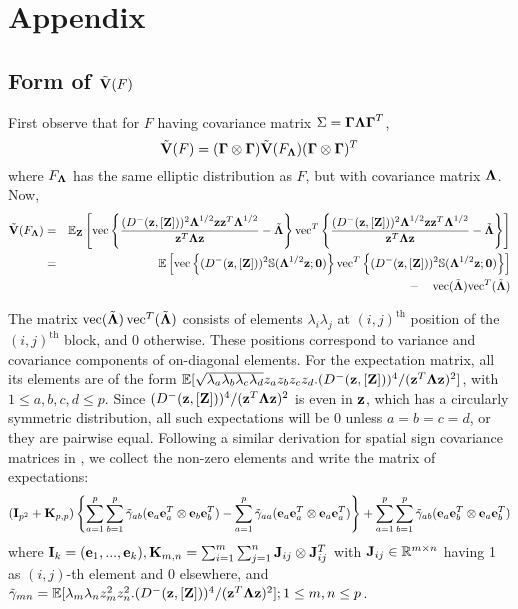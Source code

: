 \section{Appendix}
\subsection{Form of $\tilde{{\mathbf{V}}} (F)$}\label{subsec:appA}

First observe that for $F$ having covariance matrix $\Sigma = {\boldsymbol{\Gamma}}{\boldsymbol{\Lambda}}{\boldsymbol{\Gamma}}^T$,
%
$$ \tilde{{\mathbf{V}}} (F)  = ({\boldsymbol{\Gamma}} \otimes {\boldsymbol{\Gamma}}) \tilde{{\mathbf{V}}} (F_{\boldsymbol{\Lambda}}) ({\boldsymbol{\Gamma}} \otimes {\boldsymbol{\Gamma}})^T$$
%
where $F_{\boldsymbol{\Lambda}}$ has the same elliptic distribution as $F$, but with covariance matrix ${\boldsymbol{\Lambda}}$. Now,
%
\begin{eqnarray*}
\tilde{{\mathbf{V}}} (F_{\boldsymbol{\Lambda}}) &=& {\mathbb{E}}_{\mathbf{Z}} \left[ \operatorname*{vec} \left\{ \frac{( D^- ({\bf{z}}, [{\mathbf{Z}}]))^2 {\boldsymbol{\Lambda}}^{1/2} {\bf{z}}{\bf{z}}^T {\boldsymbol{\Lambda}}^{1/2} }{ {\bf{z}}^T {\boldsymbol{\Lambda}} {\bf{z}}} - \tilde {{\boldsymbol{\Lambda}}} \right\} {\operatorname*{vec}}^T \left\{ \frac{ (D^- ({\bf{z}}, [{\mathbf{Z}}] ) )^2 {\boldsymbol{\Lambda}}^{1/2} {\bf{z}} {\bf{z}}^T {\boldsymbol{\Lambda}}^{1/2} }{ {\bf{z}}^T {\boldsymbol{\Lambda}} {\bf{z}}} - \tilde {{\boldsymbol{\Lambda}}} \right\} \right]\\
&=& {\mathbb{E}} \left[ \operatorname*{vec} \left\{ ( D^- ({\bf{z}}, [{\mathbf{Z}}] ))^2 {\mathbb{S}}( {\boldsymbol{\Lambda}}^{1/2} {\bf{z}}; {\bf 0} ) \right\} {\operatorname*{vec}}^T \left\{ (D^- ({\bf{z}}, [{\mathbf{Z}}] ))^2 {\mathbb{S}}( {\boldsymbol{\Lambda}}^{1/2}{\bf{z}}; \bf0) \right\} \right]\\
&& - \quad \operatorname*{vec}( \tilde {{\boldsymbol{\Lambda}}}) {\operatorname*{vec}}^T( \tilde {{\boldsymbol{\Lambda}}} )
\end{eqnarray*}

The matrix $\operatorname*{vec}( \tilde{{\boldsymbol{\Lambda}}}) \operatorname*{vec}^T(\tilde{{\boldsymbol{\Lambda}}})$ consists of elements $\lambda_i\lambda_j$ at $(i,j)^\text{th}$ position of the $(i,j)^\text{th}$ block, and 0 otherwise. These positions correspond to variance and covariance components of on-diagonal elements. For the expectation matrix, all its elements are of the form $ {\mathbb{E}}[ \sqrt{\lambda_a \lambda_b \lambda_c \lambda_d} z_a z_b z_c z_d . (D^- ({\bf{z}}, [{\mathbf{Z}}] ))^4 / ({\bf{z}}^T {\boldsymbol{\Lambda}} {\bf{z}})^2]$, with $1 \leq a,b,c,d \leq p$. Since $(D^- ({\bf{z}}, [{\mathbf{Z}}] ))^4 / ({\bf{z}}^T {\boldsymbol{\Lambda}} {\bf{z}})^2$ is even in ${\bf{z}}$, which has a circularly symmetric distribution, all such expectations will be 0 unless $a=b=c=d$, or they are pairwise equal. Following a similar derivation for spatial sign covariance matrices in \cite{magyar14}, we collect the non-zero elements and write the matrix of expectations:
%
$$ ({\mathbf{I}}_{p^2} + {\mathbf{K}}_{p,p}) \left\{ \sum_{a=1}^p \sum_{b=1}^p \tilde\gamma_{ab} ({\bf{e}}_a {\bf{e}}_a^T \otimes  {\bf{e}}_b {\bf{e}}_b^T) - \sum_{a=1}^p \tilde\gamma_{aa} ({\bf{e}}_a {\bf{e}}_a^T \otimes  {\bf{e}}_a {\bf{e}}_a^T) \right\} + \sum_{a=1}^p \sum_{b=1}^p \tilde\gamma_{ab} ({\bf{e}}_a {\bf{e}}_b^T \otimes  {\bf{e}}_a {\bf{e}}_b^T) $$
%
where ${\mathbf{I}}_k = ({\bf{e}}_1,...,{\bf{e}}_k), {\mathbf{K}}_{m,n} = \sum_{i=1}^m \sum_{j=1}^n {\mathbf{J}}_{ij} \otimes {\mathbf{J}}_{ij}^T$ with ${\mathbf{J}}_{ij} \in {\mathbb{R}}^{m \times n}$ having 1 as $(i,j)$-th element and 0 elsewhere, and $\tilde\gamma_{mn} = {\mathbb{E}}[ \lambda_m \lambda_n z_m^2 z_n ^2 . (D^- ({\bf{z}}, [{\mathbf{Z}}] ))^4 / ({\bf{z}}^T {\boldsymbol{\Lambda}} {\bf{z}})^2]; 1 \leq m,n \leq p$.

